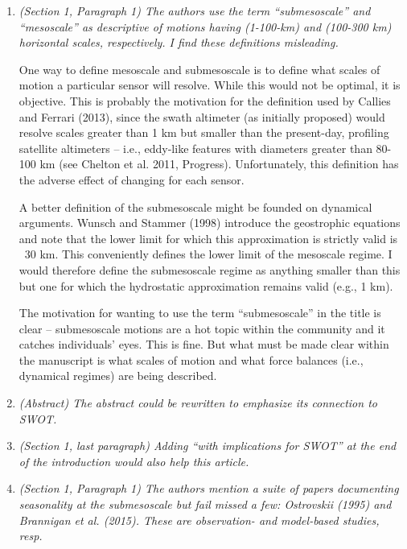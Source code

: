 \documentclass[11pt]{article}
\begin{document}
\begin{enumerate}

  \item {\it (Section 1, Paragraph 1) The authors use the term ``submesoscale'' and ``mesoscale'' as
        descriptive of motions having (1-100-km) and (100-300 km) horizontal scales,
        respectively. I find these definitions misleading.

        One way to define mesoscale and submesoscale is to define what scales of motion a
        particular sensor will resolve. While this would not be optimal, it is objective. This is
        probably the motivation for the definition used by Callies and Ferrari (2013), since the
        swath altimeter (as initially proposed) would resolve scales greater than 1 km but
        smaller than the present-day, profiling satellite altimeters – i.e., eddy-like features
        with diameters greater than 80-100 km (see Chelton et al. 2011, Progress).
        Unfortunately, this definition has the adverse effect of changing for each sensor.

        A better definition of the submesoscale might be founded on dynamical arguments.
        Wunsch and Stammer (1998) introduce the geostrophic equations and note that the
        lower limit for which this approximation is strictly valid is ~30 km. This conveniently
        defines the lower limit of the mesoscale regime. I would therefore define the
        submesoscale regime as anything smaller than this but one for which the hydrostatic
        approximation remains valid (e.g., 1 km).

      The motivation for wanting to use the term ``submesoscale'' in the title is clear –
      submesoscale motions are a hot topic within the community and it catches individuals’
      eyes. This is fine. But what must be made clear within the manuscript is what scales of
      motion and what force balances (i.e., dynamical regimes) are being described.}


  \item {\it (Abstract) The abstract could be rewritten to emphasize its connection to SWOT.}

  \item {\it (Section 1, last paragraph) Adding “with implications for SWOT” at the end of the
          introduction would also help this article.}

  \item {\it (Section 1, Paragraph 1) The authors mention a suite of papers documenting
        seasonality at the submesoscale but fail missed a few: Ostrovskii (1995) and
        Brannigan et al. (2015). These are observation- and model-based studies, resp.}


\end{enumerate}
\end{document}
